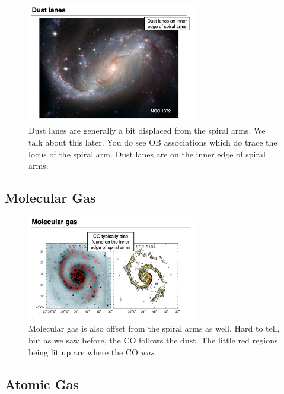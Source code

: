 \documentclass{article}
\begin{document}
\begin{figure}
    \centering
    \includegraphics[width=0.66\textwidth]{figs/Screen Shot 2021-10-27 at 9.55.32 AM.png}
    \caption{Dust lanes are generally a bit displaced from the spiral arms. We talk about this later. You do see OB associations which do trace the locus of the spiral arm. Dust lanes are on the inner edge of spiral arms.}
    \label{fig:dust_lanes}
\end{figure}

\subsection{Molecular Gas}

\begin{figure}
    \centering
    \includegraphics[width=0.66\textwidth]{figs/Screen Shot 2021-10-27 at 9.56.27 AM.png}
    \caption{Molecular gas is also offset from the spiral arms as well. Hard to tell, but as we saw before, the CO follows the dust. The little red regions being lit up are where the CO \textit{was}.}
    \label{fig:locus2}
\end{figure}

\subsection{Atomic Gas}
\end{document}
